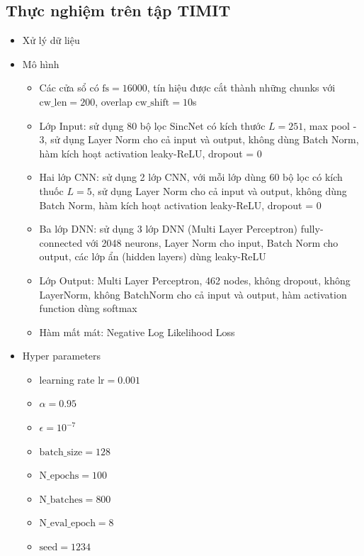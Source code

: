 \documentclass{article}
\begin{document}
	\subsection{Thực nghiệm trên tập TIMIT}
	\begin{itemize}
		\item Xử lý dữ liệu
		\item Mô hình 
		\begin{itemize}
			\item Các cửa sổ có $\text{fs} = 16000$, tín hiệu được cắt thành những chunks với $\text{cw\_len}=200$, overlap $\text{cw\_shift}=10$s
			\item Lớp Input: sử dụng 80 bộ lọc SincNet có kích thước $L=251$, max pool - 3, sử dụng Layer Norm cho cả input và output, không dùng Batch Norm, hàm kích hoạt activation leaky-ReLU, dropout = 0
			\item Hai lớp CNN: sử dụng 2 lớp CNN, với mỗi lớp dùng 60 bộ lọc có kích thuốc $L=5$, sử dụng Layer Norm cho cả input và output, không dùng Batch Norm, hàm kích hoạt activation leaky-ReLU, dropout = 0
			\item Ba lớp DNN: sử dụng 3 lớp DNN (Multi Layer Perceptron) fully-connected với 2048 neurons, Layer Norm cho input, Batch Norm cho output, các lớp ẩn (hidden layers) dùng leaky-ReLU
			\item Lớp Output: Multi Layer Perceptron, 462 nodes, không dropout, không LayerNorm, không BatchNorm cho cả input và output, hàm activation function dùng softmax
			\item Hàm mất mát: Negative Log Likelihood Loss
		\end{itemize}
		\item Hyper parameters
		\begin{itemize}
			\item learning rate $\text{lr} = 0.001$
			\item $\alpha = 0.95$
			\item $\epsilon = 10^{-7}$
			\item $\text{batch\_size}=128$
			\item $\text{N\_epochs}=100$
			\item $\text{N\_batches}=800$
			\item $\text{N\_eval\_epoch}=8$
			\item $\text{seed}=1234$
		\end{itemize}
	\end{itemize}
\end{document}

